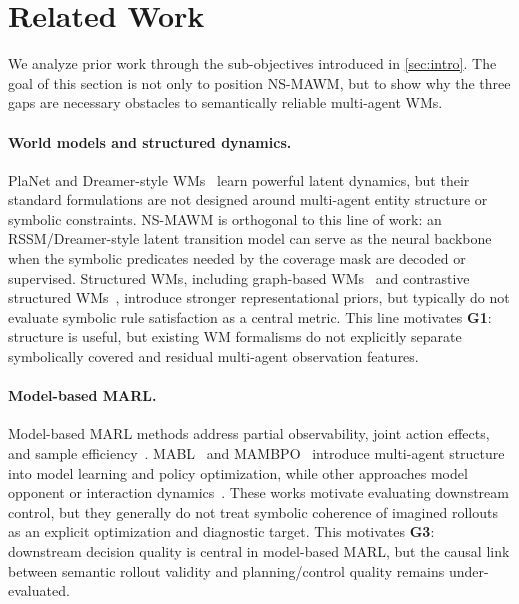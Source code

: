\documentclass{article}
\theoremstyle{plain}
\theoremstyle{definition}
\theoremstyle{remark}
\begin{document}

\section{Related Work}
\label{sec:related_work}
We analyze prior work through the sub-objectives introduced in \autoref{sec:intro}. The goal of this section is not only to position NS-MAWM, but to show why the three gaps are necessary obstacles to semantically reliable multi-agent WMs.

\paragraph{World models and structured dynamics.}
PlaNet and Dreamer-style WMs~\cite{hafner2019learning,hafner2020dreamer,hafner2021dreamerv2} learn powerful latent dynamics, but their standard formulations are not designed around multi-agent entity structure or symbolic constraints. NS-MAWM is orthogonal to this line of work: an RSSM/Dreamer-style latent transition model can serve as the neural backbone when the symbolic predicates needed by the coverage mask are decoded or supervised. Structured WMs, including graph-based WMs~\cite{zhang2021worldmodelgraph} and contrastive structured WMs~\cite{kipf2020contrastivelearningstructuredworld}, introduce stronger representational priors, but typically do not evaluate symbolic rule satisfaction as a central metric.
This line motivates \textbf{G1}: structure is useful, but existing WM formalisms do not explicitly separate symbolically covered and residual multi-agent observation features.

\paragraph{Model-based MARL.}
Model-based MARL methods address partial observability, joint action effects, and sample efficiency~\cite{Wang2022modelbasedmultiagentreinforcementlearning,Moerland2023modelbased}. MABL~\cite{Venugopal2024MABL} and MAMBPO~\cite{Willemsen2021MAMBPO} introduce multi-agent structure into model learning and policy optimization, while other approaches model opponent or interaction dynamics~\cite{Xu2022mingling,Yuxiaopeng2022modelbased,nekoei2023dealing}. These works motivate evaluating downstream control, but they generally do not treat symbolic coherence of imagined rollouts as an explicit optimization and diagnostic target.
This motivates \textbf{G3}: downstream decision quality is central in model-based MARL, but the causal link between semantic rollout validity and planning/control quality remains under-evaluated.
\end{document}
